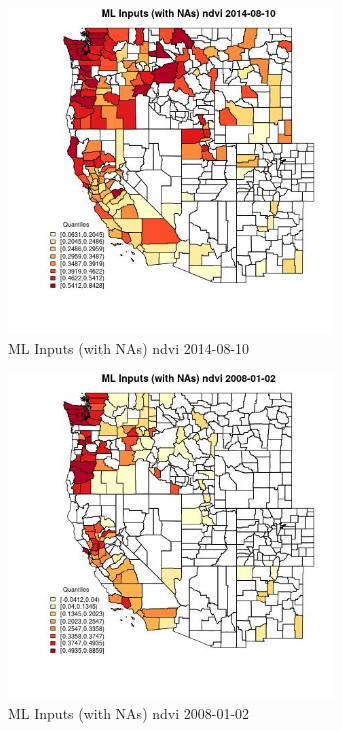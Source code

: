 \begin{figure} 
\centering  
\includegraphics[width=0.77\textwidth]{Code_Outputs/Report_ML_input_PM25_Step4_part_e_de_duplicated_aves_compiled_2019-05-18wNAs_CountyndviMean2014-08-10_2014-08-10.jpg} 
\caption{\label{fig:Report_ML_input_PM25_Step4_part_e_de_duplicated_aves_compiled_2019-05-18wNAsCountyndviMean2014-08-10_2014-08-10}ML Inputs (with NAs) ndvi 2014-08-10} 
\end{figure} 
 

\begin{figure} 
\centering  
\includegraphics[width=0.77\textwidth]{Code_Outputs/Report_ML_input_PM25_Step4_part_e_de_duplicated_aves_compiled_2019-05-18wNAs_CountyndviMean2008-01-02_2008-01-02.jpg} 
\caption{\label{fig:Report_ML_input_PM25_Step4_part_e_de_duplicated_aves_compiled_2019-05-18wNAsCountyndviMean2008-01-02_2008-01-02}ML Inputs (with NAs) ndvi 2008-01-02} 
\end{figure} 
 

